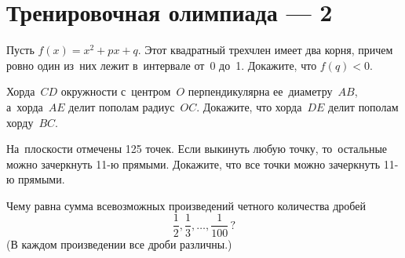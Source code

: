 
\section*{Тренировочная олимпиада — 2}


\begin{problems}

\item
Пусть $f(x) = x^2 + p x + q$.
Этот квадратный трехчлен имеет два корня, причем ровно один из~них лежит
в~интервале от~0 до~1.
Докажите, что $f(q) < 0$.

\item
Хорда~$CD$ окружности с~центром~$O$ перпендикулярна ее~диаметру~$AB$,
а~хорда~$AE$ делит пополам радиус~$OC$.
Докажите, что хорда~$DE$ делит пополам хорду~$BC$.

\item
На~плоскости отмечены 125 точек.
Если выкинуть любую точку, то~остальные можно зачеркнуть 11-ю прямыми.
Докажите, что все точки можно зачеркнуть 11-ю прямыми.

\item
Чему равна сумма всевозможных произведений четного количества дробей
\[
    \frac{1}{2}, \frac{1}{3}, \ldots, \frac{1}{100}
\,?\]
(В каждом произведении все дроби различны.)

\end{problems}

